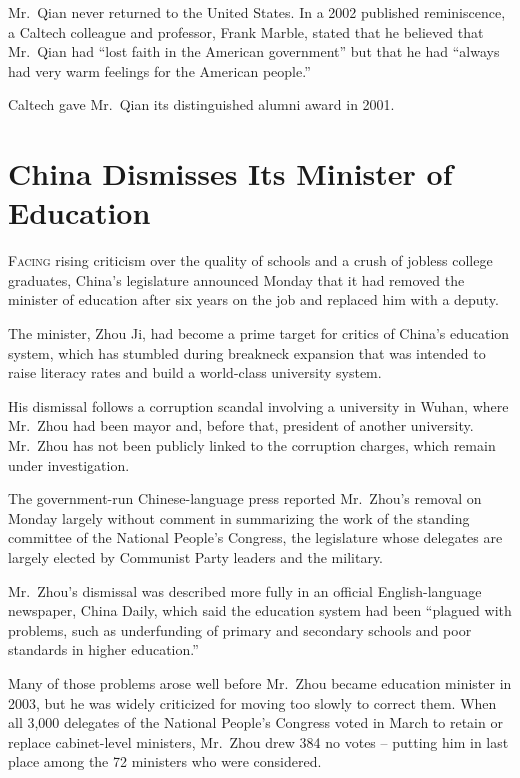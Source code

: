 ﻿\documentclass[12pt]{article}
\begin{document}
Mr.~Qian never returned to the United States. In a 2002 published reminiscence, a Caltech colleague
and professor, Frank Marble, stated that he believed that Mr.~Qian had ``lost faith in the American
government'' but that he had ``always had very warm feelings for the American people.''

Caltech gave Mr.~Qian its distinguished alumni award in 2001.

\section{China Dismisses Its Minister of Education}

\lettrine{F}{acing} rising criticism over the quality of schools and a crush
of jobless college graduates, China's legislature announced Monday that it had removed the minister
of education after six years on the job and replaced him with a deputy.

The minister, Zhou Ji, had become a prime target for critics of China's education system, which has
stumbled during breakneck expansion that was intended to raise literacy rates and build a
world-class university system.

His dismissal follows a corruption scandal involving a university in Wuhan, where Mr.~Zhou had been
mayor and, before that, president of another university. Mr.~Zhou has not been publicly linked to
the corruption charges, which remain under investigation.

The government-run Chinese-language press reported Mr.~Zhou's removal on Monday largely without
comment in summarizing the work of the standing committee of the National People's Congress, the
legislature whose delegates are largely elected by Communist Party leaders and the military.

Mr.~Zhou's dismissal was described more fully in an official English-language newspaper, China
Daily, which said the education system had been ``plagued with problems, such as underfunding of
primary and secondary schools and poor standards in higher education.''

Many of those problems arose well before Mr.~Zhou became education minister in 2003, but he was
widely criticized for moving too slowly to correct them. When all 3,000 delegates of the National
People's Congress voted in March to retain or replace cabinet-level ministers, Mr.~Zhou drew 384 no
votes -- putting him in last place among the 72 ministers who were considered.
\end{document}
